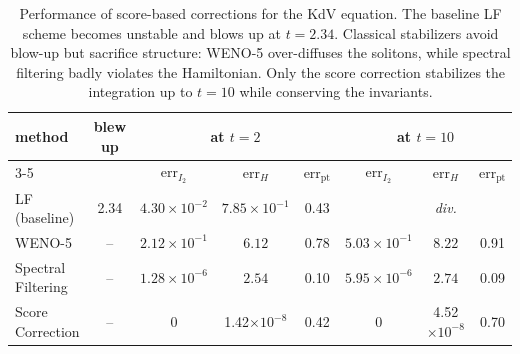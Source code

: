 \documentclass[letterpaper]{article} %
\begin{document}
\begin{table}[t]
    \centering
    \footnotesize
\caption{Performance of score-based corrections for the KdV equation. The baseline LF scheme becomes unstable and blows up at $t = 2.34$. Classical stabilizers avoid blow-up but sacrifice structure: WENO-5 over-diffuses the solitons, while spectral filtering badly violates the Hamiltonian. Only the score correction stabilizes the integration up to $t = 10$ while conserving the invariants.}


    \label{tab:kdv_marginal}
    \begin{tabular}{ l c | c c c | c c c}
        \hline
         \multirow{2}{*}{method} & \multirow{2}{*}{blew up} & \multicolumn{3}{c}{at $t = 2$} & \multicolumn{3}{c}{at $t = 10$} \\
        \cline{3-5} \cline{6-8}
          & & $\mathrm{err}_{I_2}$ & $\mathrm{err}_H$ & $\mathrm{err}_{\mathrm{pt}}$ & $\mathrm{err}_{I_2}$ & $\mathrm{err}_H$ & $\mathrm{err}_{\mathrm{pt}}$ \\
        \hline
         LF (baseline)                  & 2.34   & $4.30\times10^{-2}$ & $7.85\times10^{-1}$ & 0.43 &       & \textit{div.}      &   \\
         WENO-5             & --     & $2.12\times10^{-1}$  & $6.12$              & 0.78 & $5.03\times10^{-1}$  & $8.22$               & 0.91 \\
         Spectral Filtering  & --     & $1.28\times10^{-6}$  & $2.54$              & 0.10 & $5.95\times10^{-6}$  & $2.74$               & 0.09 \\
Score Correction  & -- & 0        & 1.42$\times10^{-8}$ & 0.42 & 0        & 4.52$\times10^{-8}$  & 0.70 \\
        \hline
    \end{tabular}
\end{table}
\end{document}
